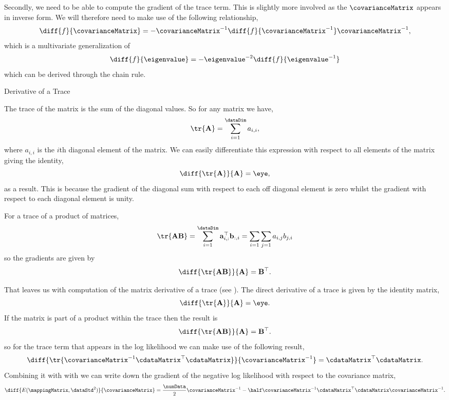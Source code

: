 Secondly, we need to be able to compute the gradient of the trace
term. This is slightly more involved as the $\covarianceMatrix$
appears in inverse form. We will therefore need to make use of the
following relationship,
\[
\diff{f}{\covarianceMatrix} =
-\covarianceMatrix^{-1}\diff{f}{\covarianceMatrix^{-1}}
\covarianceMatrix^{-1},\label{eq:invGrad}
\]
which is a multivariate generalization of
\[
\diff{f}{\eigenvalue} = -\eigenvalue^{-2}\diff{f}{\eigenvalue^{-1}}
\]
which can be derived through the chain rule. 

\begin{intfloat}
  \caption{Derivative of a Trace}\label{int:traceDerivative}

  \boxfontsize The trace of the matrix is the sum of the diagonal
  values. So for any matrix we have,
  \[
  \tr{\mathbf{A}} = \sum_{i=1}^\dataDim a_{i,i},
  \]
  where $a_{i,i}$ is the $i$th diagonal element of the matrix. We can
  easily differentiate this expression with respect to all elements of
  the matrix giving the identity,
  \[
  \diff{\tr{\mathbf{A}}}{\mathbf{A}} = \eye,
  \]
  as a result. This is because the gradient of the diagonal sum with
  respect to each off diagonal element is zero whilst the gradient with
  respect to each diagonal element is unity.

  For a trace of a product of matrices,
  \[
  \tr{\mathbf{A}\mathbf{B}} = \sum_{i=1}^\dataDim \mathbf{a}_{i,
    :}^\top\mathbf{b}_{:,i} = \sum_{i=1}\sum_{j=1} a_{i, j} b_{j,i}
  \]
  so the gradients are given by
  \[
  \diff{\tr{\mathbf{A}\mathbf{B}}}{\mathbf{A}} =\mathbf{B}^\top.
  \]
\end{intfloat}

That leaves us with computation of the matrix derivative of a trace
(see ). The direct derivative of a trace
is given by the identity matrix,
\[
\diff{\tr{\mathbf{A}}}{\mathbf{A}}=\eye. 
\]
If the matrix is part of a product within the trace then the result is
\[
\diff{\tr{\mathbf{A}\mathbf{B}}}{\mathbf{A}}=\mathbf{B}^\top. 
\]
so for the trace term that appears in the log likelihood we can make
use of the following result,
\[
\diff{\tr{\covarianceMatrix^{-1}\cdataMatrix^\top\cdataMatrix}}{\covarianceMatrix^{-1}}=\cdataMatrix^\top\cdataMatrix.
\]
Combining it with with  we can write
down the gradient of the negative log likelihood with respect to the
covariance matrix,
\begin{equation}
  \diff{E(\mappingMatrix, \dataStd^2)}{\covarianceMatrix} = \frac{\numData}{2}\covarianceMatrix^{-1} - \half\covarianceMatrix^{-1} \cdataMatrix^\top\cdataMatrix \covarianceMatrix^{-1}.\label{eq:gaussianGrad}
\end{equation}

